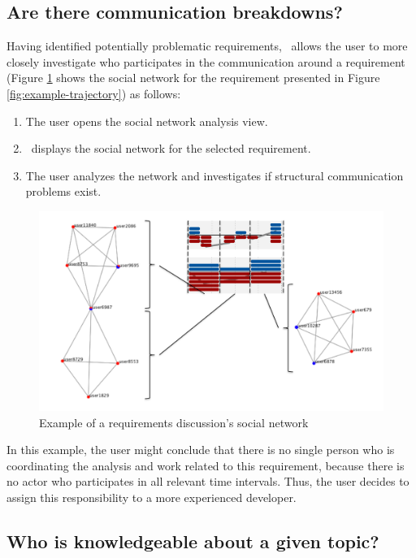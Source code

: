 \subsection{Are there communication breakdowns?}
Having identified potentially problematic requirements, \viss\  allows the user to more closely investigate who participates in the communication around a requirement (Figure \ref{fig:example-sn} shows the social network for the requirement presented in Figure \ref{fig:example-trajectory}) as follows:
\begin{enumerate}
\item The user opens the social network analysis view.
\item \viss\ displays the social network for the selected requirement.
\item The user analyzes the network and investigates if structural communication problems exist.
\end{enumerate}

\begin{figure}
\includegraphics[width=\columnwidth]{img/example-sn}
\caption{Example of a requirements discussion's social network}
\label{fig:example-sn}
\end{figure}

In this example, the user might conclude that there is no single person who is coordinating the analysis and work related to this requirement, because there is no actor who participates in all relevant time intervals.
Thus, the user decides to assign this responsibility to a more experienced developer.

\subsection{Who is knowledgeable about a given topic?}

